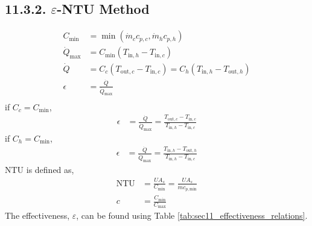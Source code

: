 \begin{multicols*}{2}
\subsection*{11.3.2. $\varepsilon$-NTU Method}
\begin{align*} 
    C_{\text{min}} &= \min(\dot{m}_c c_{p,c}, \dot{m}_h c_{p,h}) \\
    \dot{Q}_{\text{max}} &= C_{\text{min}} (T_{\text{in},h} - T_{\text{in},c}) \\
    \dot{Q} &= C_c (T_{\text{out},c} - T_{\text{in},c}) = C_h (T_{\text{in},h} - T_{\text{out},h}) \\
    \epsilon &= \frac{\dot{Q}}{\dot{Q}_{\text{max}}} \\
\end{align*}
if $C_c = C_{\text{min}}$,
\begin{align*}
    \epsilon &= \frac{\dot{Q}}{\dot{Q}_{\text{max}}} = \frac{T_{\text{out}, c} - T_{\text{in}, c}}{T_{\text{in}, h} - T_{\text{in}, c}} 
\end{align*}
if $C_h = C_{\text{min}}$,
\begin{align*}
    \epsilon &= \frac{\dot{Q}}{\dot{Q}_{\text{max}}} = \frac{T_{\text{in}, h} - T_{\text{out}, h}}{T_{\text{in}, h} - T_{\text{in}, c}}
\end{align*}
NTU is defined as,
\begin{align*}
    \text{NTU} &= \frac{UA_{s}}{C_{\text{min}}} = \frac{UA_{s}}{\dot{m} c_{p, \text{min}}} \\
    c &= \frac{C_{\text{min}}}{C_{\text{max}}} 
\end{align*}
The effectiveness, $\varepsilon$, can be found using Table \ref{tab:sec11_effectiveness_relations}.



\end{multicols*}
    
